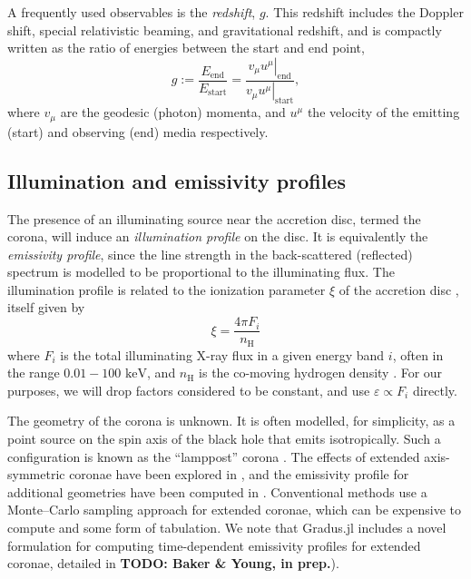 \documentclass[fleqn,usenatbib]{mnras}
\newcommand{\todo}[1]{{\noindent \bf \color{red} TODO: #1}}
\newcommand{\software}[1]{{\sc #1}}
\newcommand{\Gradus}{\software{Gradus.jl}\xspace}
\begin{document}
A frequently used observables is the \emph{redshift}, $g$. This redshift
includes the Doppler shift, special relativistic beaming, and gravitational
redshift, and is compactly written as the ratio of energies between the start
and end point,
\begin{equation}
\label{eq:redshift}
g := \frac{E_\text{end}}{E_\text{start}} = \frac{\left. v_\mu u^\mu
\right\rvert_\text{end}}{\left. v_\mu u^\mu \right\rvert_{\text{start}}},
\end{equation}
where $v_\mu$ are the geodesic (photon) momenta, and $u^\mu$ the velocity of the
emitting (start) and observing (end) media respectively.



\subsection{Illumination and emissivity profiles}
\label{sec:emissivity-profiles}

The presence of an illuminating source near the accretion disc, termed the
corona\citep{svensson_corona_1994}, will induce an \emph{illumination profile}
on the disc. It is equivalently the \emph{emissivity profile}, since the line
strength in the back-scattered (reflected) spectrum is modelled to be
proportional to the illuminating flux.  The illumination profile is related to
the ionization parameter $\xi$ of the accretion disc
\citep{laor_line_1991,ross_effects_1993,wilkins_understanding_2012}, itself
given by
\begin{equation}
    \xi = \frac{4 \pi F_i}{n_\text{H}}
\end{equation}
where $F_i$ is the total illuminating X-ray flux in a given energy band $i$, often in the range $0.01 - 100
\text{ keV}$, and $n_\text{H}$ is the co-moving hydrogen density
\citep{ross_effects_1993}.
For our purposes, we will drop factors considered to be constant, and use
$\varepsilon \propto F_i$ directly.

The geometry of the corona is unknown. It is often modelled, for simplicity, as
a point source on the spin axis of the black hole that emits isotropically. Such
a configuration is known as the ``lamppost'' corona
\citep[e.g.][]{fukumura_accretion_2007}.  The effects of extended axis-symmetric
coronae have been explored in \citet{wilkins_towards_2016}, and the emissivity
profile for additional geometries have been computed in
\citet{gonzalez_probing_2017}. Conventional methods use a Monte--Carlo sampling
approach for extended coronae, which can be expensive to compute and some form
of tabulation. We note that \Gradus includes a novel formulation for computing
time-dependent emissivity profiles for extended coronae, detailed in \todo{Baker
\& Young, in prep.}).
\end{document}
